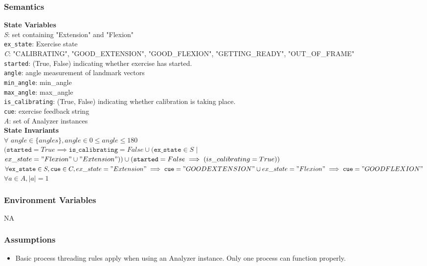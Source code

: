\documentclass[12pt, titlepage]{article}
\begin{document}
\subsubsection{Semantics}

\noindent \textbf{State Variables} \\
\textit{S}: set containing "Extension" and "Flexion"\\
\texttt{ex\_state}: Exercise state\\
\textit{C}: {"CALIBRATING", "GOOD\_EXTENSION", "GOOD\_FLEXION", "GETTING\_READY", "OUT\_OF\_FRAME"} \\
\texttt{started}: (True, False) indicating whether exercise has started.\\
\texttt{angle}: angle measurement of landmark vectors \\
\texttt{min\_angle}: min\_angle\\
\texttt{max\_angle}: max\_angle\\
\texttt{is\_calibrating}: (True, False) indicating whether calibration is taking place.\\
\texttt{cue}: exercise feedback string \\
\textit{A}: set of Analyzer instances \\



\noindent \textbf{State Invariants} \\
$\forall$ $angle \in \{angles\}, angle \in 0 \leq angle \leq 180$ \\
$ (\texttt{started} = True \implies \texttt{is\_calibrating} = False \cup (\texttt{ex\_state} \in S$ $|$ $ex\_state = 
"Flexion" \cup "Extension")) 
\cup (\texttt{started} = False \implies (is\_calibrating = True))$\\
$\forall \texttt{ex\_state} \in S, \texttt{cue} \in C, ex\_state = "Extension" \implies \texttt{cue} = "GOOD EXTENSION"
\cup ex\_state = "Flexion" \implies \texttt{cue} = "GOOD FLEXION"$\\
$\forall a \in A, |a| = 1$\\

\subsubsection{Environment Variables}
NA\\

\subsubsection{Assumptions}
\begin{itemize}
    \item Basic process threading rules apply when using an Analyzer instance. Only one process can function properly.
\end{itemize}
\end{document}
